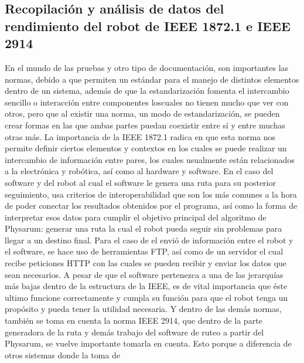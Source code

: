 \subsection{Recopilaci\'on y an\'alisis de datos del rendimiento del robot de IEEE 1872.1 e IEEE 2914}
    En el mundo de las pruebas y otro tipo de documentaci\'on,
        son importantes las normas, debido a que permiten un
        est\'andar para el manejo de distintos elementos dentro de un
        sistema, adem\'as de que la estandarizaci\'on fomenta el
        intercambio sencillo o interacci\'on entre componentes loscuales no tienen mucho que ver con otros, pero que al existir
        una norma, un modo de estandarizaci\'on, se pueden crear
        formas en las que ambas partes puedan coexistir entre s\'i y
        entre muchas otras m\'as.
    \vskip 0.5cm
    La importancia de la IEEE 1872.1 radica en que esta norma
        nos permite definir ciertos elementos y contextos en los
        cuales se puede realizar un intercambio de informaci\'on entre
        pares, los cuales usualmente est\'an relacionados a la
        electr\'onica y rob\'otica, as\'i como al hardware y software.
        En el caso del software y del robot al cual el software le
        genera una ruta para su posterior seguimiento, usa criterios
        de interoperabilidad que son los m\'as comunes a la hora de
        poder conectar los resultados obtenidos por el programa, as\'i
        como la forma de interpretar esos datos para cumplir el
        objetivo principal del algoritmo de Physarum: generar una
        ruta la cual el robot pueda seguir sin problemas para llegar a
        un destino final.
    \vskip 0.5cm
    Para el caso de el envi\'o de informaci\'on entre
        el robot y el software, se hace uso de herramientas FTP, as\'i
        como de un servidor el cual recibe peticiones HTTP con las
        cuales se pueden recibir y enviar los datos que sean
        necesarios.
    \vskip 0.5cm
    A pesar de que el software pertenezca a una de las jerarqu\'ias
        m\'as bajas dentro de la estructura de la IEEE, es de vital
        importancia que \'este ultimo funcione correctamente y
        cumpla su funci\'on para que el robot tenga un prop\'osito y
        pueda tener la utilidad necesaria.
    \vskip 0.5cm
    Y dentro de las dem\'as normas, tambi\'en se toma en cuenta la
        norma IEEE 2914, que dentro de la parte generadora de la
        ruta y dem\'as trabajo del software de ruteo a partir del
        Physarum, se vuelve importante tomarla en cuenta. Esto
        porque a diferencia de otros sistemas donde la toma de

